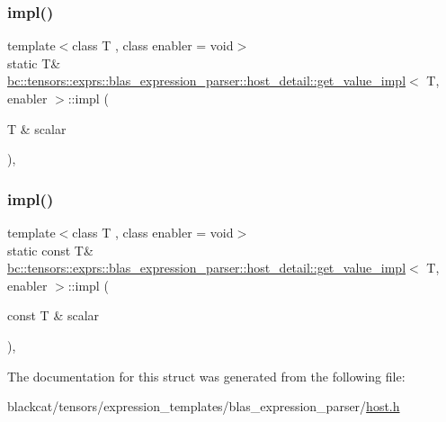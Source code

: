 \subsubsection{\texorpdfstring{impl()}{impl()}\hspace{0.1cm}{\footnotesize\ttfamily [1/2]}}
{\footnotesize\ttfamily template$<$class T , class enabler  = void$>$ \\
static T\& \hyperlink{structbc_1_1tensors_1_1exprs_1_1blas__expression__parser_1_1host__detail_1_1get__value__impl}{bc\+::tensors\+::exprs\+::blas\+\_\+expression\+\_\+parser\+::host\+\_\+detail\+::get\+\_\+value\+\_\+impl}$<$ T, enabler $>$\+::impl (\begin{DoxyParamCaption}\item[{T \&}]{scalar }\end{DoxyParamCaption})\hspace{0.3cm}{\ttfamily [inline]}, {\ttfamily [static]}}

\mbox{\label{structbc_1_1tensors_1_1exprs_1_1blas__expression__parser_1_1host__detail_1_1get__value__impl_ab561bce3439da0fa2385b239e6c8651a}} 
\subsubsection{\texorpdfstring{impl()}{impl()}\hspace{0.1cm}{\footnotesize\ttfamily [2/2]}}
{\footnotesize\ttfamily template$<$class T , class enabler  = void$>$ \\
static const T\& \hyperlink{structbc_1_1tensors_1_1exprs_1_1blas__expression__parser_1_1host__detail_1_1get__value__impl}{bc\+::tensors\+::exprs\+::blas\+\_\+expression\+\_\+parser\+::host\+\_\+detail\+::get\+\_\+value\+\_\+impl}$<$ T, enabler $>$\+::impl (\begin{DoxyParamCaption}\item[{const T \&}]{scalar }\end{DoxyParamCaption})\hspace{0.3cm}{\ttfamily [inline]}, {\ttfamily [static]}}



The documentation for this struct was generated from the following file\+:\begin{DoxyCompactItemize}
\item 
blackcat/tensors/expression\+\_\+templates/blas\+\_\+expression\+\_\+parser/\hyperlink{tensors_2expression__templates_2blas__expression__parser_2host_8h}{host.\+h}\end{DoxyCompactItemize}
